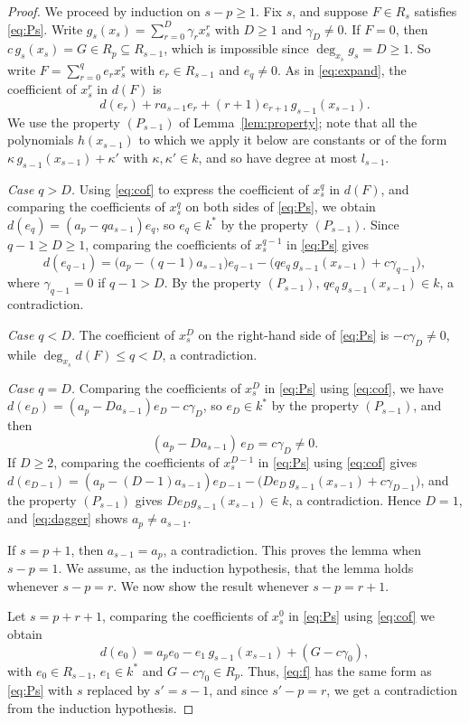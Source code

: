 \documentclass[11pt]{amsart}
\theoremstyle{definition}
\theoremstyle{remark}
\numberwithin{equation}{theorem}
\begin{document}
\begin{proof}
We proceed by induction on $s-p\ge1$. Fix $s$, and suppose $F\in R_s$ satisfies \eqref{eq:Ps}.
Write $g_s(x_s)=\sum_{r=0}^{D}\gamma_rx_s^r$ with $D\ge1$ and $\gamma_D\neq0$. If $F=0$, then
$c\,g_s(x_s)=G\in R_p\subseteq R_{s-1}$, which is impossible since $\deg_{x_s}g_s=D\ge1$. So write
$F=\sum_{r=0}^qe_rx_s^r$ with $e_r\in R_{s-1}$ and $e_q\neq0$. As in \eqref{eq:expand}, the coefficient
of $x_s^r$ in $d(F)$ is
\begin{equation}\label{eq:cof}
 d(e_r)+ra_{s-1}e_r+(r+1)e_{r+1}\,g_{s-1}(x_{s-1}).   
\end{equation}
We use the property $(P_{s-1})$ of
Lemma~\ref{lem:property}; note that all the polynomials $h(x_{s-1})$ to which we apply it below are
constants or of the form $\kappa\,g_{s-1}(x_{s-1})+\kappa'$ with $\kappa,\kappa'\in k$, and so have degree
at most $l_{s-1}$.

\emph{Case $q>D$.} Using \eqref{eq:cof} to express the coefficient of $x_s^q$ in $d(F)$, and comparing the coefficients of $x_s^q$ on both sides of \eqref{eq:Ps}, we obtain $d(e_q)=(a_p-qa_{s-1})e_q$, so
$e_q\in k^*$ by the property $(P_{s-1})$. Since $q-1\ge D\ge1$, comparing the coefficients of $x_s^{q-1}$ in \eqref{eq:Ps} gives
\[
d(e_{q-1})=\bigl(a_p-(q-1)a_{s-1}\bigr)e_{q-1}-\bigl(qe_q\,g_{s-1}(x_{s-1})+c\gamma_{q-1}\bigr),
\]
where $\gamma_{q-1}=0$ if $q-1>D$. By the property $(P_{s-1})$, $qe_q\,g_{s-1}(x_{s-1})\in k$, a contradiction.

\emph{Case $q<D$.} The coefficient of $x_s^D$ on the right-hand side of \eqref{eq:Ps} is
$-c\gamma_D\neq0$, while $\deg_{x_s}d(F)\le q<D$, a contradiction.

\emph{Case $q=D$.} Comparing the coefficients of $x_s^D$ in \eqref{eq:Ps} using \eqref{eq:cof}, we have
$d(e_D)=(a_p-Da_{s-1})e_D-c\gamma_D$, so $e_D\in k^*$ by the property $(P_{s-1})$, and then
\begin{equation}\label{eq:dagger}
(a_p-Da_{s-1})\,e_D=c\gamma_D\neq0 .
\end{equation}
If $D\ge2$, comparing the coefficients of $x_s^{D-1}$ in \eqref{eq:Ps} using \eqref{eq:cof} gives
$d(e_{D-1})=(a_p-(D-1)a_{s-1})e_{D-1}-\bigl(De_D\,g_{s-1}(x_{s-1})+c\gamma_{D-1}\bigr)$, and the property $(P_{s-1})$
gives $De_Dg_{s-1}(x_{s-1})\in k$, a contradiction. Hence $D=1$, and \eqref{eq:dagger} shows
$a_p\neq a_{s-1}$.

If $s=p+1$, then $a_{s-1}=a_p$, a contradiction. This proves the lemma when $s-p=1$. We assume, as the induction hypothesis, that the lemma holds whenever $s-p=r$. We now show the result whenever $s-p=r+1.$

Let $s=p+r+1$, comparing the coefficients of $x_s^0$ in \eqref{eq:Ps} using \eqref{eq:cof} we obtain
\begin{equation}\label{eq:f}
    d(e_0)=a_pe_0-e_1\,g_{s-1}(x_{s-1})+(G-c\gamma_0),
\end{equation}
with $e_0\in R_{s-1}$, $e_1\in k^*$ and $G-c\gamma_0\in R_p$. Thus, \eqref{eq:f} has the same form as \eqref{eq:Ps} with $s$ replaced by $s'=s-1$, and since $s'-p=r$, we get a contradiction from the induction hypothesis. 
\end{proof}
\end{document}
